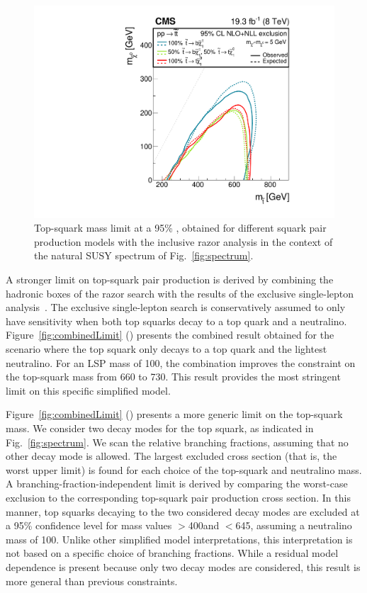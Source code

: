 \begin{figure}[tb!]
\centering
 \includegraphics[width=\cmsFigWidth]{figs/analysis8TeV/T2HybridNew0Lp1Lp2LBARE.pdf}
 \caption{Top-squark mass limit at a 95\% \CL, obtained for different
   squark pair production models with the inclusive razor analysis in the
   context of the natural SUSY spectrum of
   Fig.~\ref{fig:spectrum}.\label{fig:stopSUMMARY}}

\end{figure}

A stronger limit on top-squark pair production is derived by combining
the hadronic boxes of the razor search with the results of the
exclusive single-lepton analysis~\cite{1LepMVA}. The exclusive
single-lepton search is conservatively assumed to only have
sensitivity when both top squarks decay to a top quark and a
neutralino. Figure~\ref{fig:combinedLimit} (\cmsLeft) presents the combined result obtained for the scenario where the top
squark only decays to a top quark and the lightest neutralino. For an
LSP mass of 100\GeV, the combination improves the constraint on the
top-squark mass from 660 to 730\GeV. This result provides the
most stringent limit on this specific simplified model.


Figure~\ref{fig:combinedLimit} (\cmsRight) presents a more generic limit on the
top-squark mass. We consider two decay modes for the top squark, as
indicated in Fig.~\ref{fig:spectrum}. We scan the relative branching
fractions, assuming that no other decay mode is allowed. The largest
excluded cross section (that is, the worst upper limit) is found for
each choice of the top-squark and neutralino mass. A
branching-fraction-independent limit is derived by comparing the
worst-case exclusion to the corresponding top-squark pair production
cross section. In this manner, top squarks decaying to the two
considered decay modes are excluded at a 95\% confidence level for
mass values $>$400\GeV and $<$645\GeV, assuming a neutralino mass of
100\GeV. Unlike other simplified model interpretations, this
interpretation is not based on a specific choice of branching
fractions. While a residual model dependence is present because only
two decay modes are considered, this result is more general than
previous constraints.

